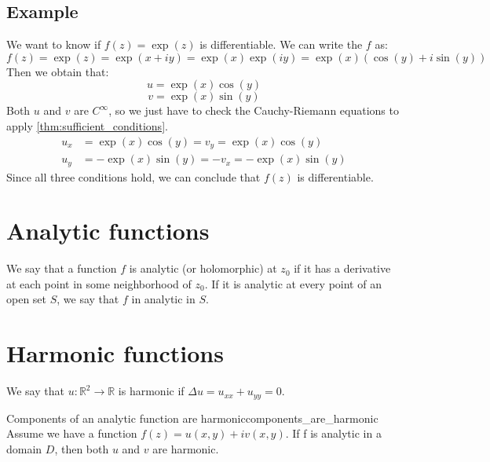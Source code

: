 \documentclass{article}
\def\R{\mathbb{R}}
\renewcommand{\exp}[1]{\operatorname{exp}\left(#1\right)}
\begin{document}
    \subsection*{Example}
    We want to know if $f(z) = \exp{z}$ is differentiable. We can write the $f$ as:
    \begin{equation*}
        f(z) = \exp{z} = \exp{x+iy} = \exp{x}\exp{iy} = \exp{x}(\cos(y) + i\sin(y))
    \end{equation*}
    Then we obtain that:
    \begin{equation*}
        u = \exp{x}\cos(y)
    \end{equation*}
    \begin{equation*}
        v = \exp{x}\sin(y)
    \end{equation*}
    \noindent
    Both $u$ and $v$ are $C^\infty$, so we just have to check the Cauchy-Riemann equations to apply \ref{thm:sufficient_conditions}.
    \begin{align*}
        u_x &= \exp{x}\cos(y) = v_y = \exp{x}\cos(y) \\
        u_y &= -\exp{x}\sin(y) = -v_x = -\exp{x}\sin(y)
    \end{align*}
    Since all three conditions hold, we can conclude that $f(z)$ is differentiable.

    \section{Analytic functions}
    We say that a function $f$ is analytic (or holomorphic) at $z_0$ if it has a derivative at each point in some neighborhood of $z_0$. If it is analytic at every point of an open set $S$, we say that $f$ in analytic in $S$.

    \section{Harmonic functions}
    We say that $u\colon\R^2 \longrightarrow \R$ is harmonic if $\Delta u = u_{xx} + u_{yy} = 0$.

    \begin{theorem}{Components of an analytic function are harmonic}{components_are_harmonic}
        Assume we have a function $f(z) = u(x,y) + iv(x,y)$. If f is analytic in a domain $D$, then both $u$ and $v$ are harmonic.
    \end{theorem}
\end{document}
